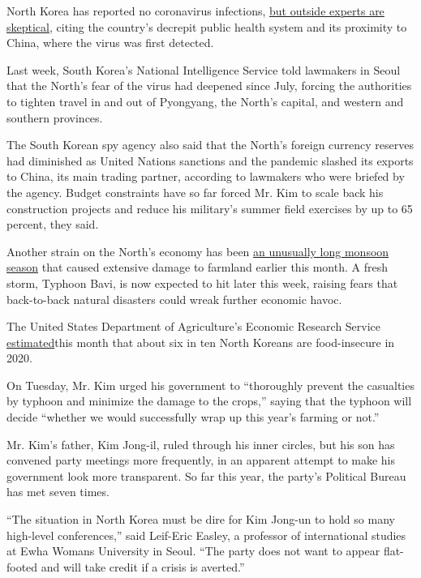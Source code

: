 North Korea has reported no coronavirus infections,
\href{https://www.nytimes3xbfgragh.onion/2020/03/31/world/asia/north-korea-coronavirus.html?action=click\&module=RelatedLinks\&pgtype=Article}{but
outside experts are skeptical}, citing the country's decrepit public
health system and its proximity to China, where the virus was first
detected.

Last week, South Korea's National Intelligence Service told lawmakers in
Seoul that the North's fear of the virus had deepened since July,
forcing the authorities to tighten travel in and out of Pyongyang, the
North's capital, and western and southern provinces.

The South Korean spy agency also said that the North's foreign currency
reserves had diminished as United Nations sanctions and the pandemic
slashed its exports to China, its main trading partner, according to
lawmakers who were briefed by the agency. Budget constraints have so far
forced Mr. Kim to scale back his construction projects and reduce his
military's summer field exercises by up to 65 percent, they said.

Another strain on the North's economy has been
\href{https://www.nytimes3xbfgragh.onion/2020/08/14/world/asia/north-korea-floods-coronavirus.html}{an
unusually long monsoon season} that caused extensive damage to farmland
earlier this month. A fresh storm, Typhoon Bavi, is now expected to hit
later this week, raising fears that back-to-back natural disasters could
wreak further economic havoc.

The United States Department of Agriculture's Economic Research Service
\href{https://www.ers.usda.gov/webdocs/outlooks/99088/gfa-31.pdf?v=6328.4}{estimated}this
month that about six in ten North Koreans are food-insecure in 2020.

On Tuesday, Mr. Kim urged his government to ``thoroughly prevent the
casualties by typhoon and minimize the damage to the crops,'' saying
that the typhoon will decide ``whether we would successfully wrap up
this year's farming or not.''

Mr. Kim's father, Kim Jong-il, ruled through his inner circles, but his
son has convened party meetings more frequently, in an apparent attempt
to make his government look more transparent. So far this year, the
party's Political Bureau has met seven times.

``The situation in North Korea must be dire for Kim Jong-un to hold so
many high-level conferences,'' said Leif-Eric Easley, a professor of
international studies at Ewha Womans University in Seoul. ``The party
does not want to appear flat-footed and will take credit if a crisis is
averted.''

